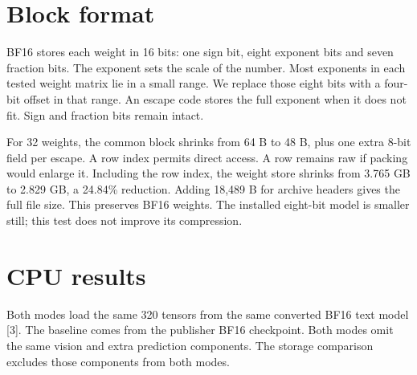 \documentclass[10pt,letterpaper]{article}
\begin{document}
\section{Block format}
BF16 stores each weight in 16 bits: one sign bit, eight exponent bits and seven fraction bits. The exponent sets the scale of the number. Most exponents in each tested weight matrix lie in a small range. We replace those eight bits with a four-bit offset in that range. An escape code stores the full exponent when it does not fit. Sign and fraction bits remain intact.

For 32 weights, the common block shrinks from 64 B to 48 B, plus one extra 8-bit field per escape. A row index permits direct access. A row remains raw if packing would enlarge it. Including the row index, the weight store shrinks from 3.765 GB to 2.829 GB, a 24.84\% reduction. Adding 18,489 B for archive headers gives the full file size. This preserves BF16 weights. The installed eight-bit model is smaller still; this test does not improve its compression.

\newpage
\section{CPU results}
Both modes load the same 320 tensors from the same converted BF16 text model [3]. The baseline comes from the publisher BF16 checkpoint. Both modes omit the same vision and extra prediction components. The storage comparison excludes those components from both modes.
\end{document}
